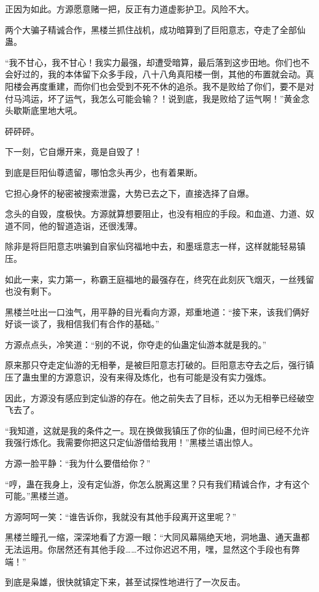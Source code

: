 \begin{this_body}
正因为如此。方源愿意赌一把，反正有力道虚影护卫。风险不大。

两个大骗子精诚合作，黑楼兰抓住战机，成功暗算到了巨阳意志，夺走了全部仙蛊。

“我不甘心，我不甘心！我实力最强，却遭受暗算，最后落到这步田地。你们也不会好过的，我的本体留下众多手段，八十八角真阳楼一倒，其他的布置就会动。真阳楼会再度重建，而你们也会受到不死不休的追杀。我不是败给了你们，要不是对付马鸿运，坏了运气，我怎么可能会输？！说到底，我是败给了运气啊！”黄金念头歇斯底里地大吼。

砰砰砰。

下一刻，它自爆开来，竟是自毁了！

到底是巨阳仙尊遗留，哪怕念头再少，也有着果断。

它担心身怀的秘密被搜索泄露，大势已去之下，直接选择了自爆。

念头的自毁，度极快。方源就算想要阻止，也没有相应的手段。和血道、力道、奴道不同，他的智道造诣，还很浅薄。

除非是将巨阳意志哄骗到自家仙窍福地中去，和墨瑶意志一样，这样就能轻易镇压。

如此一来，实力第一，称霸王庭福地的最强存在，终究在此刻灰飞烟灭，一丝残留也没有剩下。

黑楼兰吐出一口浊气，用平静的目光看向方源，郑重地道：“接下来，该我们俩好好谈一谈了，我相信我们有合作的基础。”

方源点点头，冷笑道：“别的不说，你夺走的仙蛊定仙游本就是我的。”

原来那只夺走定仙游的无相拳，是被巨阳意志打破的。巨阳意志夺去之后，强行镇压了蛊虫里的方源意识，没有来得及炼化，也有可能是没有实力强炼。

因此，方源没有感应到定仙游的存在。他之前失去了目标，还以为无相拳已经破空飞去了。

“我知道，这就是我的条件之一。现在换做我镇压了你的仙蛊，但时间已经不允许我强行炼化。我需要你把这只定仙游借给我用！”黑楼兰语出惊人。

方源一脸平静：“我为什么要借给你？”

“哼，蛊在我身上，没有定仙游，你怎么脱离这里？只有我们精诚合作，才有这个可能。”黑楼兰道。

方源呵呵一笑：“谁告诉你，我就没有其他手段离开这里呢？”

黑楼兰瞳孔一缩，深深地看了方源一眼：“大同风幕隔绝天地，洞地蛊、通天蛊都无法运用。你居然还有其他手段……不过你迟迟不用，嘿，显然这个手段也有弊端！”

到底是枭雄，很快就镇定下来，甚至试探性地进行了一次反击。


\end{this_body}
